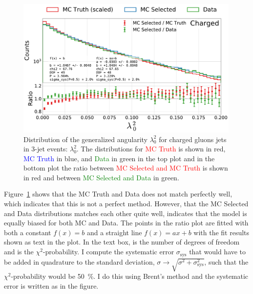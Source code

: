 \begin{figure}[h!]
  \centerfloat
  \includegraphics[width=0.99\textwidth, trim=0 0 0 0, clip, page=1]{figures/quarks/generalized_angularities_cha-down_sample=1.00-ML_vars=vertex-selection=b-ejet_min=4-n_iter_RS_lgb=99-n_iter_RS_xgb=9-cdot_cut=0.90-version=19.pdf}
  \caption[Generalized Angularities for Charged Gluons Jets in 3-Jet Events: $\lambda_0^2$]
          {Distribution of the generalized angularity $\lambda_0^2$ for charged gluons jets in 3-jet events: $\lambda_0^2$. The distributions for \textcolor{red}{MC Truth} is shown in red, \textcolor{blue}{MC Truth} in blue, and \textcolor{green}{Data} in green in the top plot and in the bottom plot the ratio between \textcolor{red}{MC Selected and MC Truth} is shown in red and between \textcolor{green}{MC Selected and Data} in green. }
  \label{fig:q:generalized_angularities_cha_lambda_0_2_nonappendix}
\end{figure}

Figure~\ref{fig:q:generalized_angularities_cha_lambda_0_2_nonappendix} shows that the MC Truth and Data does not match perfectly well, which indicates that this is not a perfect method. However, that the MC Selected and Data distributions matches each other quite well, indicates that the model is equally biased for both MC and Data. 
The points in the ratio plot are fitted with both a constant ${f(x)=b}$ and a straight line $f(x)=ax+b$ with the fit results shown as text in the plot. In the text box,  is the number of degrees of freedom and  is the $\chi^2$-probability. I compute the systematic error $\sigma_\mathrm{sys}$ that would have to be added in quadrature to the standard deviation, $\sigma \rightarrow \sqrt{\sigma^2 + \sigma_\mathrm{sys}^2}$, such that the $\chi^2$-probability would be \SI{50}{\percent}. I do this using Brent's method \autocite{Brent:113464} and the systematic error is written as  in the figure. 

